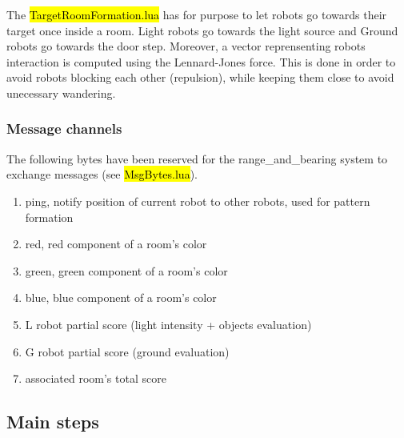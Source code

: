 The \hl{TargetRoomFormation.lua} has for purpose to let robots go towards their
target once inside a room. Light robots go towards the light source and Ground
robots go towards the door step. Moreover, a vector reprensenting robots
interaction is computed using the Lennard-Jones force. This is done in order
to avoid robots blocking each other (repulsion), while keeping them close to
avoid unecessary wandering.

\subsubsection{Message channels}

The following bytes have been reserved for the range\_and\_bearing system to
exchange messages (see \hl{MsgBytes.lua}).

\begin{enumerate}
    \item ping, notify position of current robot to other robots, used for
    pattern formation
    \item red, red component of a room's color
    \item green, green component of a room's color
    \item blue, blue component of a room's color
    \item L robot partial score (light intensity + objects evaluation)
    \item G robot partial score (ground evaluation)
    \item associated room's total score
\end{enumerate}

\subsection{Main steps}

